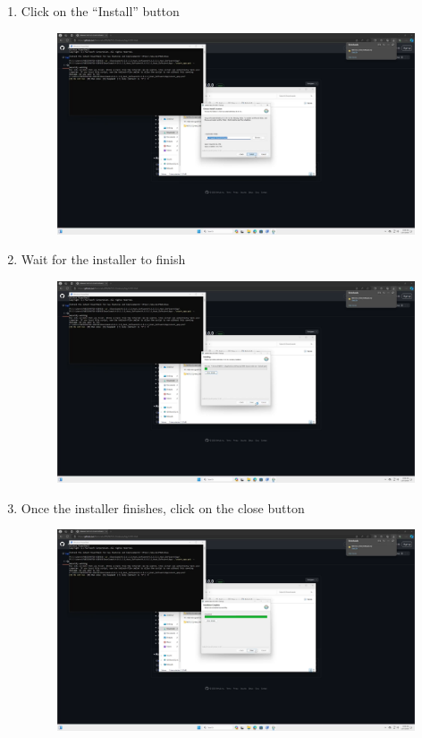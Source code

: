 \documentclass[12pt]{article}
\begin{document}
\begin{center}
\begin{enumerate}
\begin{figure}[H]
		      \end{figure}
		\item Click on the ``Install'' button
		      \begin{figure}[H]
			      \includegraphics[width=\textwidth]{Figures/Windows-wkhtmltopdf-Menu-2.png}
		      \end{figure}
		\item Wait for the installer to finish
		      \begin{figure}[H]
			      \includegraphics[width=\textwidth]{Figures/Windows-wkhtmltopdf-Menu-3.png}
		      \end{figure}
		\item Once the installer finishes, click on the close button
		      \begin{figure}[H]
			      \includegraphics[width=\textwidth]{Figures/Windows-wkhtmltopdf-Menu-3-Close.png}

\end{figure}
\end{enumerate}
\end{center}
\end{document}
